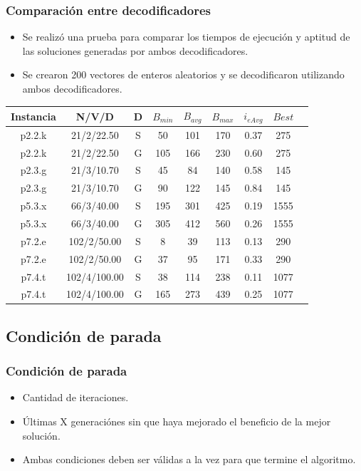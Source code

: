 \documentclass{beamer}
\begin{document}
\begin{frame}
\frametitle{Comparación entre decodificadores}

\begin{itemize}
    \item Se realizó una prueba para comparar los tiempos de ejecución y aptitud de las soluciones generadas por ambos decodificadores.
    \item Se crearon 200 vectores de enteros aleatorios y se decodificaron utilizando ambos decodificadores.
    \pause
\end{itemize}

\begin{table}
\begin{center}
\begin{tabular}{ |c|c|c|c|c|c|c|c|c| } 
\hline
Instancia & N/V/D & D & $B_{min}$ & $B_{avg}$ & $B_{max}$ & $i_{eAvg}$ & $Best$ \\
\hline
p2.2.k & 21/2/22.50 & S & 50 & 101 & 170 & 0.37 & 275 \\
p2.2.k & 21/2/22.50 & G & 105 & 166 & 230 & 0.60 & 275 \\
p2.3.g & 21/3/10.70 & S & 45 & 84 & 140 & 0.58 & 145 \\
p2.3.g & 21/3/10.70 & G & 90 & 122 & 145 & 0.84 & 145 \\
p5.3.x & 66/3/40.00 & S & 195 & 301 & 425 & 0.19 & 1555 \\
p5.3.x & 66/3/40.00 & G & 305 & 412 & 560 & 0.26 & 1555 \\
p7.2.e & 102/2/50.00 & S & 8 & 39 & 113 & 0.13 & 290 \\
p7.2.e & 102/2/50.00 & G & 37 & 95 & 171 & 0.33 & 290 \\
p7.4.t & 102/4/100.00 & S & 38 & 114 & 238 & 0.11 & 1077 \\
p7.4.t & 102/4/100.00 & G & 165 & 273 & 439 & 0.25 & 1077 \\
\hline
\end{tabular}
\end{center}
\label{tab:resultadosDecoSimple}
\end{table}


\end{frame}


\subsection{Condición de parada}

\begin{frame}
\frametitle{Condición de parada}

\begin{itemize}
    \item Cantidad de iteraciones.
    \pause
    \item \'Ultimas X generaciónes sin que haya mejorado el beneficio de la mejor solución.
    \pause
    \item Ambas condiciones deben ser válidas a la vez para que termine el algoritmo.
\end{itemize}

\end{frame}
\end{document}
